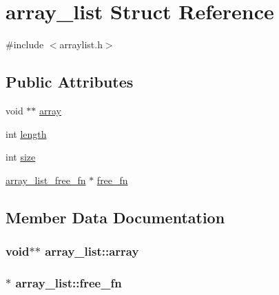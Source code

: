 \hypertarget{structarray__list}{}\section{array\+\_\+list Struct Reference}
\label{structarray__list}


{\ttfamily \#include $<$arraylist.\+h$>$}

\subsection*{Public Attributes}
\begin{DoxyCompactItemize}
\item 
void $\ast$$\ast$ \hyperlink{structarray__list_a7ba65feda2b156148c08667cf155b657}{array}
\item 
int \hyperlink{structarray__list_a442fcfde196a3cc95a647f0708de814d}{length}
\item 
int \hyperlink{structarray__list_aba48a197d3c8f1d56682da23fe883d0a}{size}
\item 
\hyperlink{arraylist_8h_a41e5f51b1befa448b861e61a2c352bd6}{array\+\_\+list\+\_\+free\+\_\+fn} $\ast$ \hyperlink{structarray__list_ab7989cdde357e5c7819c562c7680ab74}{free\+\_\+fn}
\end{DoxyCompactItemize}


\subsection{Member Data Documentation}
\subsubsection[{\texorpdfstring{array}{array}}]{\setlength{\rightskip}{0pt plus 5cm}void$\ast$$\ast$ array\+\_\+list\+::array}\hypertarget{structarray__list_a7ba65feda2b156148c08667cf155b657}{}\label{structarray__list_a7ba65feda2b156148c08667cf155b657}
\subsubsection[{\texorpdfstring{free\+\_\+fn}{free_fn}}]{$\ast$ array\+\_\+list\+::free\+\_\+fn}\hypertarget{structarray__list_ab7989cdde357e5c7819c562c7680ab74}{}\label{structarray__list_ab7989cdde357e5c7819c562c7680ab74}
